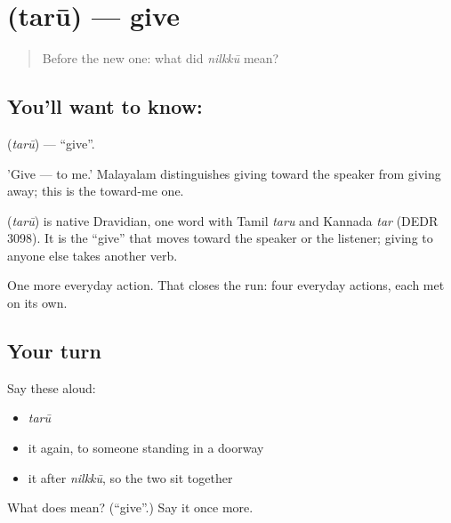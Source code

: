 \section[\texorpdfstring{\ml{തരൂ} (tarū)}{തരൂ (tarū)}]{ (tarū) — give}

\label{lesson:ML-C43-give}



\begin{quote}
Before the new one: what did \emph{nilkkū} mean?
\end{quote}

\subsection*{You'll want to know: }
\textbf{} (\emph{tarū}) — \textquotedblleft{}give\textquotedblright{}.

'Give — to me.' Malayalam distinguishes giving toward the speaker from giving away; this is the toward-me one.

\begin{cousinweb}
\textbf{} (\emph{tarū}) is native Dravidian, one word with Tamil \emph{taru} and Kannada \emph{tar} (DEDR 3098). It is the \textquotedblleft{}give\textquotedblright{} that moves toward the speaker or the listener; giving to anyone else takes another verb.
\end{cousinweb}

\begin{grammarlens}[title={What you've built}]
One more everyday action. That closes the run: four everyday actions, each met on its own.
\end{grammarlens}

\subsection*{Your turn}
Say these aloud:

\begin{itemize}
\raggedright
  \item \emph{tarū}
  \item it again, to someone standing in a doorway
  \item it after \emph{nilkkū}, so the two sit together
\end{itemize}

\begin{tcolorbox}[breakable,colback=teal!4,colframe=teal!35!black,title={Before you move on}]
What does  mean? (\textquotedblleft{}give\textquotedblright{}.) Say it once more.
\end{tcolorbox}
